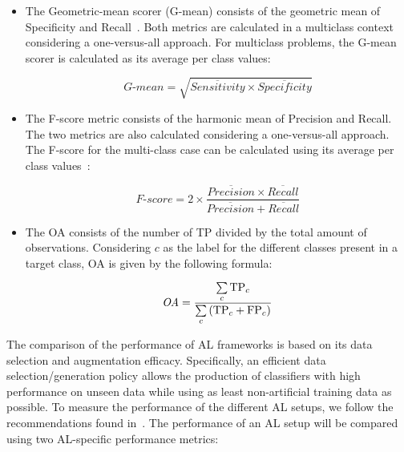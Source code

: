 \documentclass[preprint, 12pt]{elsarticle}
\begin{document}
\begin{itemize}
    \item The Geometric-mean scorer (G-mean) consists of the geometric mean of
        Specificity and Recall~\cite{Kubat1997}. Both metrics are calculated
        in a multiclass context considering a one-versus-all approach. For
        multiclass problems, the G-mean scorer is calculated as its average
        per class values: 
        
        \begin{equation*}
            \textit{G-mean} = \sqrt{\overline{Sensitivity} \times
            \overline{Specificity}}
        \end{equation*}

    \item The F-score metric consists of the harmonic mean of Precision and
        Recall. The two metrics are also calculated considering a
        one-versus-all approach. The F-score for the multi-class case can be
        calculated using its average per class values~\cite{Jeni2013}:

        \begin{equation*}
            \textit{F-score}=2\times\frac{\overline{Precision} \times
            \overline{Recall}}{\overline{Precision} + \overline{Recall}}
        \end{equation*}

    \item The OA consists of the number of TP divided by the total amount of
        observations. Considering $c$ as the label for the different classes
        present in a target class, OA is given by the following formula:

        \begin{equation*}
            \textit{OA} = \frac{\sum\limits_{c}{\text{TP}_{c}}}{%
		    	      \sum\limits_{c}{(\text{TP}_{c}+\text{FP}_{c})}}
        \end{equation*}
\end{itemize}

The comparison of the performance of AL frameworks is based on its data
selection and augmentation efficacy. Specifically, an efficient data
selection/generation policy allows the production of classifiers with high
performance on unseen data while using as least non-artificial training data
as possible. To measure the performance of the different AL setups, we follow
the recommendations found in~\cite{Kottke2017}. The performance of an AL setup
will be compared using two AL-specific performance metrics:
\end{document}
